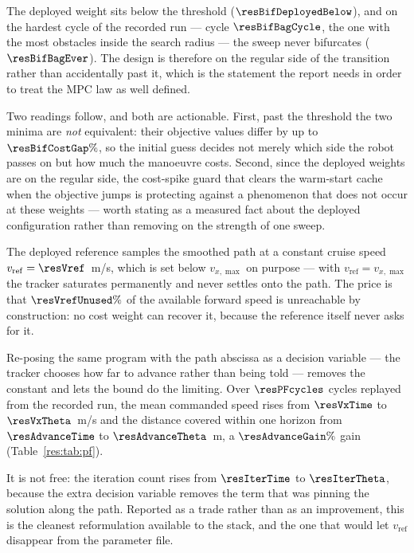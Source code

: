 The deployed weight sits below the threshold ($\resBifDeployedBelow$), and on the hardest cycle of the recorded run --- cycle $\resBifBagCycle$, the one with the most obstacles inside the search radius --- the sweep never bifurcates ($\resBifBagEver$). The design is therefore on the regular side of the transition rather than accidentally past it, which is the statement the report needs in order to treat the MPC law as well defined.

Two readings follow, and both are actionable. First, past the threshold the two minima are \emph{not} equivalent: their objective values differ by up to $\resBifCostGap\%$, so the initial guess decides not merely which side the robot passes on but how much the manoeuvre costs. Second, since the deployed weights are on the regular side, the cost-spike guard that clears the warm-start cache when the objective jumps is protecting against a phenomenon that does not occur at these weights --- worth stating as a measured fact about the deployed configuration rather than removing on the strength of one sweep.


\label{res:pf}


The deployed reference samples the smoothed path at a constant cruise speed $v_{\mathrm{ref}}=\resVref$~m/s, which is set below $v_{x,\max}$ on purpose --- with $v_{\mathrm{ref}}=v_{x,\max}$ the tracker saturates permanently and never settles onto the path. The price is that $\resVrefUnused\%$ of the available forward speed is unreachable by construction: no cost weight can recover it, because the reference itself never asks for it.

Re-posing the same program with the path abscissa as a decision variable --- the tracker chooses how far to advance rather than being told --- removes the constant and lets the bound do the limiting. Over $\resPFcycles$ cycles replayed from the recorded run, the mean commanded speed rises from $\resVxTime$ to $\resVxTheta$~m/s and the distance covered within one horizon from $\resAdvanceTime$ to $\resAdvanceTheta$~m, a $\resAdvanceGain\%$ gain (Table~\ref{res:tab:pf}).

It is not free: the iteration count rises from $\resIterTime$ to $\resIterTheta$, because the extra decision variable removes the term that was pinning the solution along the path. Reported as a trade rather than as an improvement, this is the cleanest reformulation available to the stack, and the one that would let $v_{\mathrm{ref}}$ disappear from the parameter file.


